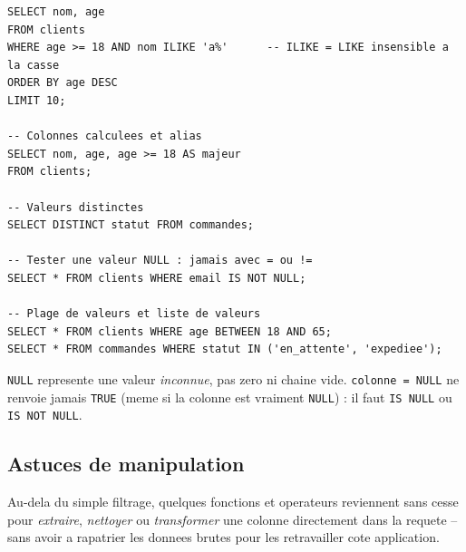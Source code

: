 \documentclass[11pt,a4paper]{article}
\begin{document}
\begin{lstlisting}
SELECT nom, age
FROM clients
WHERE age >= 18 AND nom ILIKE 'a%'      -- ILIKE = LIKE insensible a la casse
ORDER BY age DESC
LIMIT 10;

-- Colonnes calculees et alias
SELECT nom, age, age >= 18 AS majeur
FROM clients;

-- Valeurs distinctes
SELECT DISTINCT statut FROM commandes;

-- Tester une valeur NULL : jamais avec = ou !=
SELECT * FROM clients WHERE email IS NOT NULL;

-- Plage de valeurs et liste de valeurs
SELECT * FROM clients WHERE age BETWEEN 18 AND 65;
SELECT * FROM commandes WHERE statut IN ('en_attente', 'expediee');
\end{lstlisting}

\begin{piege}
\texttt{NULL} represente une valeur \emph{inconnue}, pas zero ni chaine vide.
\texttt{colonne = NULL} ne renvoie jamais \texttt{TRUE} (meme si la colonne est
vraiment \texttt{NULL}) : il faut \texttt{IS NULL} ou \texttt{IS NOT NULL}.
\end{piege}

\subsection{Astuces de manipulation}
Au-dela du simple filtrage, quelques fonctions et operateurs reviennent sans
cesse pour \emph{extraire}, \emph{nettoyer} ou \emph{transformer} une colonne
directement dans la requete -- sans avoir a rapatrier les donnees brutes pour
les retravailler cote application.
\end{document}
